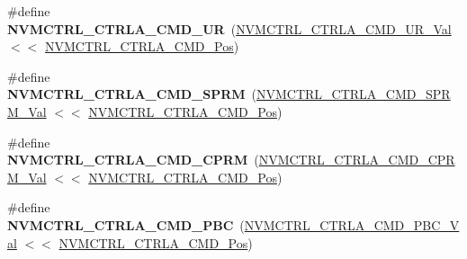 \begin{DoxyCompactItemize}
\item 
\hypertarget{group___s_a_m_l21___n_v_m_c_t_r_l_ga30fba14a1d68d389de8d0e878e9aeed5}{}\#define {\bfseries N\+V\+M\+C\+T\+R\+L\+\_\+\+C\+T\+R\+L\+A\+\_\+\+C\+M\+D\+\_\+\+U\+R}~(\hyperlink{group___s_a_m_l21___n_v_m_c_t_r_l_ga594434a1450c942a3a1b8938d7f8ee50}{N\+V\+M\+C\+T\+R\+L\+\_\+\+C\+T\+R\+L\+A\+\_\+\+C\+M\+D\+\_\+\+U\+R\+\_\+\+Val}      $<$$<$ \hyperlink{group___s_a_m_l21___n_v_m_c_t_r_l_ga5346c6f8ba695f7cadb7f07bde6e25f8}{N\+V\+M\+C\+T\+R\+L\+\_\+\+C\+T\+R\+L\+A\+\_\+\+C\+M\+D\+\_\+\+Pos})\label{group___s_a_m_l21___n_v_m_c_t_r_l_ga30fba14a1d68d389de8d0e878e9aeed5}

\item 
\hypertarget{group___s_a_m_l21___n_v_m_c_t_r_l_gaaa9412be92f5cb4cbf868ce2532930aa}{}\#define {\bfseries N\+V\+M\+C\+T\+R\+L\+\_\+\+C\+T\+R\+L\+A\+\_\+\+C\+M\+D\+\_\+\+S\+P\+R\+M}~(\hyperlink{group___s_a_m_l21___n_v_m_c_t_r_l_ga5e5184e115f92e2037793f468f07e912}{N\+V\+M\+C\+T\+R\+L\+\_\+\+C\+T\+R\+L\+A\+\_\+\+C\+M\+D\+\_\+\+S\+P\+R\+M\+\_\+\+Val}    $<$$<$ \hyperlink{group___s_a_m_l21___n_v_m_c_t_r_l_ga5346c6f8ba695f7cadb7f07bde6e25f8}{N\+V\+M\+C\+T\+R\+L\+\_\+\+C\+T\+R\+L\+A\+\_\+\+C\+M\+D\+\_\+\+Pos})\label{group___s_a_m_l21___n_v_m_c_t_r_l_gaaa9412be92f5cb4cbf868ce2532930aa}

\item 
\hypertarget{group___s_a_m_l21___n_v_m_c_t_r_l_ga682f47adcc9972101304cccbc5c112bd}{}\#define {\bfseries N\+V\+M\+C\+T\+R\+L\+\_\+\+C\+T\+R\+L\+A\+\_\+\+C\+M\+D\+\_\+\+C\+P\+R\+M}~(\hyperlink{group___s_a_m_l21___n_v_m_c_t_r_l_ga5af4406a70755e9869cbddf9aeccba45}{N\+V\+M\+C\+T\+R\+L\+\_\+\+C\+T\+R\+L\+A\+\_\+\+C\+M\+D\+\_\+\+C\+P\+R\+M\+\_\+\+Val}    $<$$<$ \hyperlink{group___s_a_m_l21___n_v_m_c_t_r_l_ga5346c6f8ba695f7cadb7f07bde6e25f8}{N\+V\+M\+C\+T\+R\+L\+\_\+\+C\+T\+R\+L\+A\+\_\+\+C\+M\+D\+\_\+\+Pos})\label{group___s_a_m_l21___n_v_m_c_t_r_l_ga682f47adcc9972101304cccbc5c112bd}

\item 
\hypertarget{group___s_a_m_l21___n_v_m_c_t_r_l_ga99e7d43b40b4c0db731bae7c936af4a4}{}\#define {\bfseries N\+V\+M\+C\+T\+R\+L\+\_\+\+C\+T\+R\+L\+A\+\_\+\+C\+M\+D\+\_\+\+P\+B\+C}~(\hyperlink{group___s_a_m_l21___n_v_m_c_t_r_l_gaa88d2aeae32e10443a0e9dc516dfbf44}{N\+V\+M\+C\+T\+R\+L\+\_\+\+C\+T\+R\+L\+A\+\_\+\+C\+M\+D\+\_\+\+P\+B\+C\+\_\+\+Val}     $<$$<$ \hyperlink{group___s_a_m_l21___n_v_m_c_t_r_l_ga5346c6f8ba695f7cadb7f07bde6e25f8}{N\+V\+M\+C\+T\+R\+L\+\_\+\+C\+T\+R\+L\+A\+\_\+\+C\+M\+D\+\_\+\+Pos})\label{group___s_a_m_l21___n_v_m_c_t_r_l_ga99e7d43b40b4c0db731bae7c936af4a4}


\end{DoxyCompactItemize}
